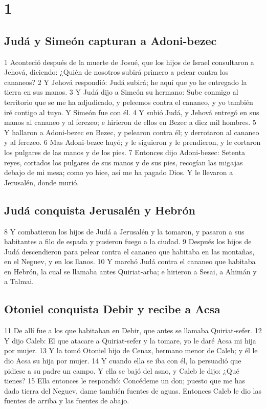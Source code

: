 
\chapter{1}

\section*{Judá y Simeón capturan a Adoni-bezec}

1 Aconteció después de la muerte de Josué, que los hijos de Israel consultaron a Jehová, diciendo: ¿Quién de nosotros subirá primero a pelear contra los cananeos?
2 Y Jehová respondió: Judá subirá; he aquí que yo he entregado la tierra en sus manos.
3 Y Judá dijo a Simeón su hermano: Sube conmigo al territorio que se me ha adjudicado, y peleemos contra el cananeo, y yo también iré contigo al tuyo. Y Simeón fue con él.
4 Y subió Judá, y Jehová entregó en sus manos al cananeo y al ferezeo; e hirieron de ellos en Bezec a diez mil hombres.
5 Y hallaron a Adoni-bezec en Bezec, y pelearon contra él; y derrotaron al cananeo y al ferezeo.
6 Mas Adoni-bezec huyó; y le siguieron y le prendieron, y le cortaron los pulgares de las manos y de los pies.
7 Entonces dijo Adoni-bezec: Setenta reyes, cortados los pulgares de sus manos y de sus pies, recogían las migajas debajo de mi mesa; como yo hice, así me ha pagado Dios. Y le llevaron a Jerusalén, donde murió.

\section*{Judá conquista Jerusalén y Hebrón}

8 Y combatieron los hijos de Judá a Jerusalén y la tomaron, y pasaron a sus habitantes a filo de espada y pusieron fuego a la ciudad.
9 Después los hijos de Judá descendieron para pelear contra el cananeo que habitaba en las montañas, en el Neguev, y en los llanos.
10 Y marchó Judá contra el cananeo que habitaba en Hebrón, la cual se llamaba antes Quiriat-arba; e hirieron a Sesai, a Ahimán y a Talmai.

\section*{Otoniel conquista Debir y recibe a Acsa }

11 De allí fue a los que habitaban en Debir, que antes se llamaba Quiriat-sefer. 
12 Y dijo Caleb: El que atacare a Quiriat-sefer y la tomare, yo le daré Acsa mi hija por mujer.
13 Y la tomó Otoniel hijo de Cenaz, hermano menor de Caleb; y él le dio Acsa su hija por mujer.
14 Y cuando ella se iba con él, la persuadió que pidiese a su padre un campo. Y ella se bajó del asno, y Caleb le dijo: ¿Qué tienes?
15 Ella entonces le respondió: Concédeme un don; puesto que me has dado tierra del Neguev, dame también fuentes de aguas. Entonces Caleb le dio las fuentes de arriba y las fuentes de abajo.

